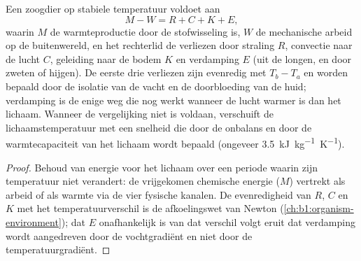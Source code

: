 \begin{proposition}[De warmtebalans]\label{prop:b1:mammal-organization:heatbudget}
Een zoogdier op stabiele temperatuur voldoet aan
\[
M - W = R + C + K + E ,
\]
waarin $M$ de warmteproductie door de stofwisseling is, $W$ de mechanische
arbeid op de buitenwereld, en het rechterlid de verliezen door straling $R$,
convectie naar de lucht $C$, geleiding naar de bodem $K$ en verdamping $E$
(uit de longen, en door zweten of hijgen). De eerste drie verliezen zijn
evenredig met $T_b - T_a$ en worden bepaald door de isolatie van de vacht en de
doorbloeding van de huid; verdamping is de enige weg die nog werkt wanneer de
lucht warmer is dan het lichaam. Wanneer de vergelijking niet is voldaan,
verschuift de lichaamstemperatuur met een snelheid die door de onbalans en door
de warmtecapaciteit van het lichaam wordt bepaald (ongeveer
\qty{3.5}{kJ.kg^{-1}.K^{-1}}).
\end{proposition}
\begin{proof}
Behoud van energie voor het lichaam over een periode waarin zijn temperatuur
niet verandert: de vrijgekomen chemische energie ($M$) vertrekt als arbeid of
als warmte via de vier fysische kanalen. De evenredigheid van $R$, $C$ en $K$
met het temperatuurverschil is de afkoelingswet van Newton
(\cref{ch:b1:organism-environment}); dat $E$ onafhankelijk is van dat verschil
volgt eruit dat verdamping wordt aangedreven door de vochtgradiënt en niet door
de temperatuurgradiënt.
\end{proof}

